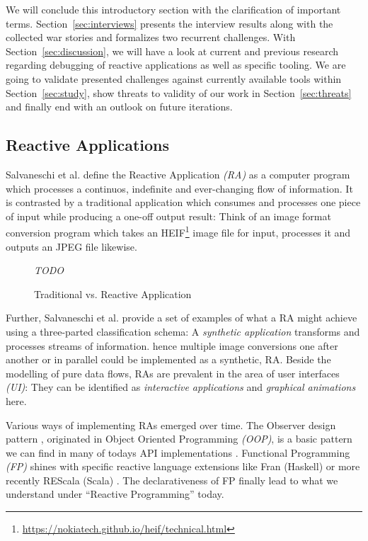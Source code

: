 \documentclass[12pt,a4paper]{article}
\begin{document}
We will conclude this introductory section with the clarification of important terms. Section~\ref{sec:interviews} presents the interview results along with the collected war stories and formalizes two recurrent challenges. With Section~\ref{sec:discussion}, we will have a look at current and previous research regarding debugging of reactive applications as well as specific tooling. We are going to validate presented challenges against currently available tools within Section~\ref{sec:study}, show threats to validity of our work in Section~\ref{sec:threats} and finally end with an outlook on future iterations.

\subsection{Reactive Applications}

Salvaneschi et al. \cite{comprehendingReactiveApplications} define the Reactive Application \emph{(RA)} as a computer program which processes a continuos, indefinite and ever-changing flow of information. It is contrasted by a traditional application which consumes and processes one piece of input while producing a one-off output result: Think of an image format conversion program which takes an HEIF\footnote{\url{https://nokiatech.github.io/heif/technical.html}} image file for input, processes it and outputs an JPEG file likewise.

\begin{figure}[h]
	\centering
	\emph{TODO}

	\caption{Traditional vs. Reactive Application}
	\label{fig:reactive-application}
\end{figure}

Further, Salvaneschi et al. provide a set of examples of what a RA might achieve using a three-parted classification schema: A \emph{synthetic application} transforms and processes streams of information. hence multiple image conversions one after another or in parallel could be implemented as a synthetic, RA. Beside the modelling of pure data flows, RAs are prevalent in the area of user interfaces \emph{(UI)}: They can be identified as \emph{interactive applications} and \emph{graphical animations} here.

Various ways of implementing RAs emerged over time. The Observer design pattern \cite{observerDesignPattern}, originated in Object Oriented Programming \emph{(OOP)}, is a basic pattern we can find in many of todays API implementations \cite{ownPaper}. Functional Programming \emph{(FP)} shines with specific reactive language extensions like Fran (Haskell) \cite{SurveyOnReactiveProgramming} or more recently REScala (Scala) \cite{10.1145/2577080.2577083}. The declarativeness of FP finally lead to what we understand under ``Reactive Programming'' today.
\end{document}
